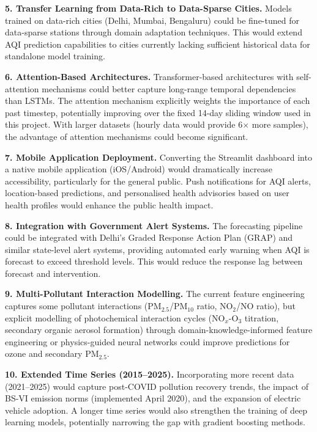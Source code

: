 \documentclass[12pt,a4paper]{report}
\begin{document}
\textbf{5. Transfer Learning from Data-Rich to Data-Sparse Cities.} Models trained on data-rich cities (Delhi, Mumbai, Bengaluru) could be fine-tuned for data-sparse stations through domain adaptation techniques. This would extend AQI prediction capabilities to cities currently lacking sufficient historical data for standalone model training.

\textbf{6. Attention-Based Architectures.} Transformer-based architectures with self-attention mechanisms could better capture long-range temporal dependencies than LSTMs. The attention mechanism explicitly weights the importance of each past timestep, potentially improving over the fixed 14-day sliding window used in this project. With larger datasets (hourly data would provide 6$\times$ more samples), the advantage of attention mechanisms could become significant.

\textbf{7. Mobile Application Deployment.} Converting the Streamlit dashboard into a native mobile application (iOS/Android) would dramatically increase accessibility, particularly for the general public. Push notifications for AQI alerts, location-based predictions, and personalised health advisories based on user health profiles would enhance the public health impact.

\textbf{8. Integration with Government Alert Systems.} The forecasting pipeline could be integrated with Delhi's Graded Response Action Plan (GRAP) and similar state-level alert systems, providing automated early warning when AQI is forecast to exceed threshold levels. This would reduce the response lag between forecast and intervention.

\textbf{9. Multi-Pollutant Interaction Modelling.} The current feature engineering captures some pollutant interactions (PM$_{2.5}$/PM$_{10}$ ratio, NO$_2$/NO ratio), but explicit modelling of photochemical interaction cycles (NO$_x$-O$_3$ titration, secondary organic aerosol formation) through domain-knowledge-informed feature engineering or physics-guided neural networks could improve predictions for ozone and secondary PM$_{2.5}$.

\textbf{10. Extended Time Series (2015--2025).} Incorporating more recent data (2021--2025) would capture post-COVID pollution recovery trends, the impact of BS-VI emission norms (implemented April 2020), and the expansion of electric vehicle adoption. A longer time series would also strengthen the training of deep learning models, potentially narrowing the gap with gradient boosting methods.
\end{document}
